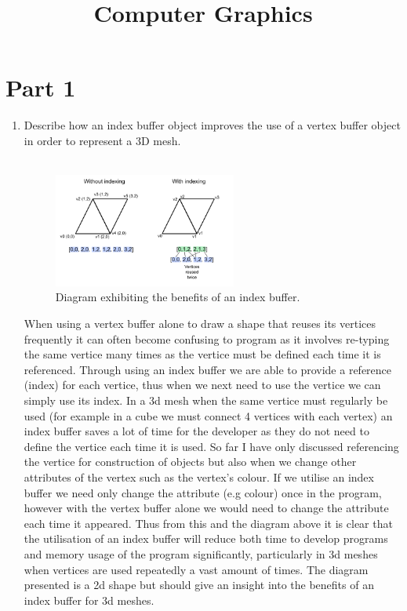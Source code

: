 \documentclass{mm2}
\title{Computer Graphics}
\begin{document}
\section{Part 1}
\begin{enumerate}
\item Describe how an index buffer object improves the use of a vertex buffer object in order to represent a 3D mesh.\\ 
\\
\begin{figure}[ht]
	\centering
	\includegraphics[width=6cm]{INDEXING.PNG}
	\caption{Diagram exhibiting the benefits of an index buffer.}
\end{figure}

\subitem When using a vertex buffer alone to draw a shape that reuses its vertices frequently it can often become confusing to program as it involves re-typing the same vertice many times as the vertice must be defined each time it is referenced. Through using an index buffer we are able to provide a reference (index) for each vertice, thus when we next need to use the vertice we can simply use its index. In a 3d mesh when the same vertice must regularly be used (for example in a cube we must connect 4 vertices with each vertex) an index buffer saves a lot of time for the developer as they do not need to define the vertice each time it is used. So far I have only discussed referencing the vertice for construction of objects but also when we change other attributes of the vertex such as the vertex's colour. If we utilise an index buffer we need only change the attribute (e.g colour) once in the program, however with the vertex buffer alone we would need to change the attribute each time it appeared. Thus from this and the diagram above it is clear that the utilisation of an index buffer will reduce both time to develop programs and memory usage of the program significantly, particularly in 3d meshes when vertices are used repeatedly a vast amount of times. The diagram presented is a 2d shape but should give an insight into the benefits of an index buffer for 3d meshes.\\



\end{enumerate}
\end{document}
